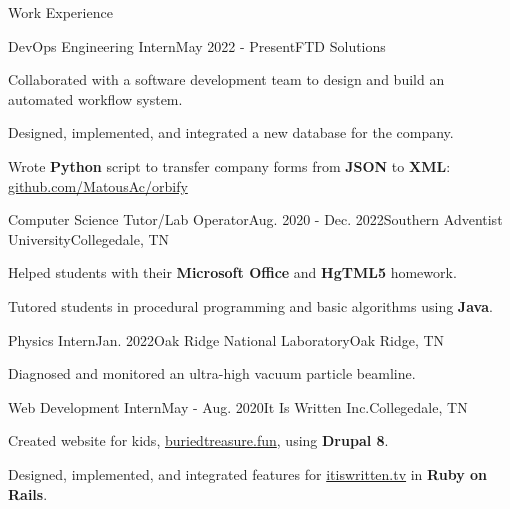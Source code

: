 \begin{rSection}{Work Experience}
  \begin{job}{DevOps Engineering Intern}{May 2022 - Present}{FTD Solutions}{}
    \item Collaborated with a software development team to design and build an automated workflow system.
    \item Designed, implemented, and integrated a new database for the company.
    \item Wrote {\bf Python} script to transfer company forms from {\bf JSON} to {\bf XML}: \href{https://github.com/MatousAc/orbify}{github.com/MatousAc/orbify}
  \end{job}

  \begin{job}{Computer Science Tutor/Lab Operator}{Aug. 2020 - Dec. 2022}{Southern Adventist University}{Collegedale, TN}{}
    \item Helped students with their {\bf Microsoft Office} and {\bf HgTML5} homework.
    \item Tutored students in procedural programming and basic algorithms using {\bf Java}.
  \end{job}

  \begin{job}{Physics Intern}{Jan. 2022}{Oak Ridge National Laboratory}{Oak Ridge, TN}
    \item Diagnosed and monitored an ultra-high vacuum particle beamline.
  \end{job}

  \begin{job}{Web Development Intern}{May - Aug. 2020}{It Is Written Inc.}{Collegedale, TN}
    \item Created website for kids, \href{https://buriedtreasure.fun/}{buriedtreasure.fun}, using {\bf Drupal 8}.
    \item Designed, implemented, and integrated features for \href{https://itiswritten.tv}{itiswritten.tv} in {\bf Ruby on Rails}.
  \end{job}
\end{rSection}
